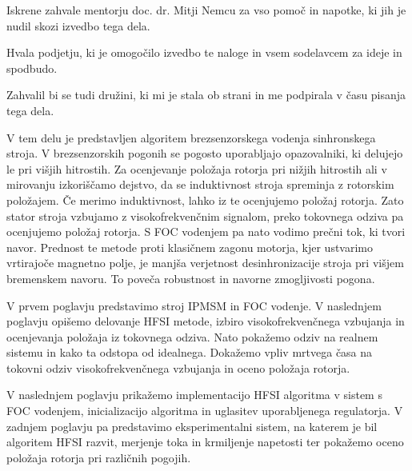 \documentclass[a4paper,twoside,openright,12pt,slovene]{book}
\date{Ljubljana, \the\year}
\begin{document}
\frontmatter


\maketitle

\zahvala

Iskrene zahvale mentorju doc. dr. Mitji Nemcu za vso pomoč in napotke, ki jih je nudil skozi izvedbo tega dela. 

Hvala podjetju, ki je omogočilo izvedbo te naloge in vsem sodelavcem za ideje in spodbudo.

Zahvalil bi se tudi družini, ki mi je stala ob strani in me podpirala v času pisanja tega dela.

\povzetek

V tem delu je predstavljen algoritem brezsenzorskega vodenja sinhronskega stroja. V brezsenzorskih pogonih se pogosto uporabljajo opazovalniki, ki delujejo le pri višjih hitrostih. Za ocenjevanje
položaja rotorja pri nižjih hitrostih ali v mirovanju izkoriščamo dejstvo, da se induktivnost stroja spreminja z rotorskim položajem. Če merimo induktivnost, lahko iz te ocenjujemo položaj rotorja.
Zato stator stroja vzbujamo z visokofrekvenčnim signalom, preko tokovnega odziva pa ocenjujemo položaj rotorja. S FOC vodenjem pa nato vodimo prečni tok, ki tvori navor. Prednost te metode proti
klasičnem zagonu motorja, kjer ustvarimo vrtirajoče magnetno polje, je manjša verjetnost desinhronizacije stroja pri višjem bremenskem navoru. To poveča robustnost in navorne zmogljivosti pogona.

V prvem poglavju predstavimo stroj IPMSM in FOC vodenje. V naslednjem poglavju opišemo delovanje HFSI metode, izbiro visokofrekvenčnega vzbujanja in ocenjevanja položaja iz tokovnega odziva. Nato
pokažemo odziv na realnem sistemu in kako ta odstopa od idealnega. Dokažemo vpliv mrtvega časa na tokovni odziv visokofrekvenčnega vzbujanja in oceno položaja rotorja.

V naslednjem poglavju prikažemo implementacijo HFSI algoritma v sistem s FOC vodenjem, inicializacijo algoritma in uglasitev uporabljenega regulatorja. V zadnjem poglavju pa predstavimo
eksperimentalni sistem, na katerem je bil algoritem HFSI razvit, merjenje toka in krmiljenje napetosti ter pokažemo oceno položaja rotorja pri različnih pogojih.
\end{document}
